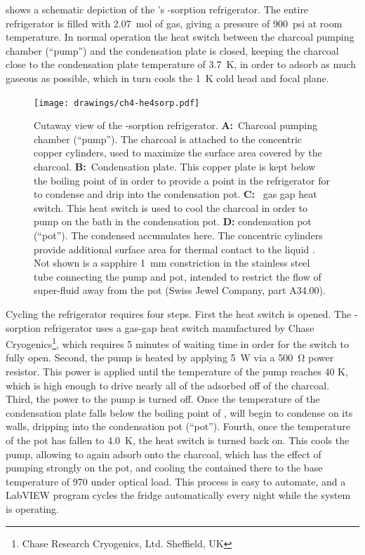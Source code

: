  shows a schematic depiction of the \Imager's -sorption refrigerator.
The entire refrigerator is filled with \SI{2.07}{\mole} of  gas, giving a pressure of \SI{900}{psi} at room temperature.
In normal operation the heat switch between the charcoal pumping chamber (``pump'') and the  condensation plate is closed, keeping the charcoal close to the condensation plate temperature of \SI{3.7}{\K}, in order to adsorb as much gaseous  as possible, which in turn cools the \SI{1}{\K} cold head and focal plane.

\begin{figure}
\centering
\texttt{[image: drawings/ch4-he4sorp.pdf]}
\caption[Cutaway view of the -sorption refrigerator]{
  Cutaway view of the -sorption refrigerator.
  \textbf{A:}\ Charcoal pumping chamber (``pump'').
  The charcoal is attached to the concentric copper cylinders, used to maximize the surface area covered by the charcoal.
  \textbf{B:}\ Condensation plate.
  This copper plate is kept below the boiling point of  in order to provide a point in the refrigerator for  to condense and drip into the condensation pot.
  \textbf{C:}\  gas gap heat switch.
  This heat switch is used to cool the charcoal in order to pump on the  bath in the condensation pot. \textbf{D:}  condensation pot (``pot'').
  The condensed  accumulates here.
  The concentric cylinders provide additional surface area for thermal contact to the liquid .
  Not shown is a sapphire \SI{1}{\mm} constriction in the stainless steel tube connecting the pump and pot, intended to restrict the flow of super-fluid  away from the pot (Swiss Jewel Company, part A34.00).
}
\label{fig:he4sorp}
\end{figure}

Cycling the refrigerator requires four steps.
First the heat switch is opened.
The -sorption refrigerator uses a  gas-gap heat switch manufactured by Chase Cryogenics\footnote{Chase Research Cryogenics, Ltd. Sheffield, UK}, which requires 5 minutes of waiting time in order for the switch to fully open.
Second, the pump is heated by applying \SI{5}{\W} via a \SI{500}{\ohm} power resistor.
This power is applied until the temperature of the pump reaches 40 K, which is high enough to drive nearly all of the adsorbed  off of the charcoal.
Third, the power to the pump is turned off.
Once the temperature of the condensation plate falls below the boiling point of ,  will begin to condense on its walls, dripping into the  condensation pot (``pot'').
Fourth, once the temperature of the pot has fallen to \SI{4.0}{\K}, the heat switch is turned back on.
This cools the pump, allowing  to again adsorb onto the charcoal, which has the effect of pumping strongly on the pot, and cooling the  contained there to the base temperature of \SI{970}{\mK} under optical load.
This process is easy to automate, and a LabVIEW program cycles the fridge automatically every night while the system is operating.

